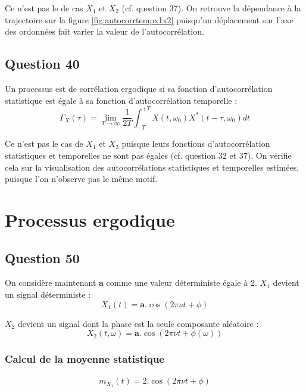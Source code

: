 \documentclass{article}
\begin{document}
\noindent
Ce n'est pas le de cas $X_1$ et $X_2$ (cf. question 37). On retrouve la dépendance à la trajectoire sur la figure \ref{fig:autocorrtempx1x2} puisqu'un déplacement sur l'axe des ordonnées fait varier la valeur de l'autocorrélation.

\subsection*{Question 40}
Un processus est de corrélation ergodique si sa fonction d'autocorrélation statistique est égale à sa fonction d'autocorrélation temporelle :
\begin{equation*}
\Gamma_X(\tau) = \lim_{T\rightarrow\infty}\frac{1}{2T}\int_{-T}^{+T}X(t,\omega_0)X^*(t-\tau,\omega_0)dt
\end{equation*}

\noindent
Ce n'est pas le cas de $X_1$ et $X_2$ puisque leurs fonctions d'autocorrélation statistiques et temporelles ne sont pas égales (cf. question 32 et 37). On vérifie cela sur la visualisation des autocorrélations statistiques et temporelles estimées, puisque l'on n'observe pas le même motif.

\section{Processus ergodique}

\subsection*{Question 50}
On considère maintenant $\boldsymbol{a}$ comme une valeur déterministe égale à $2$.
\noindent
$X_1$ devient un signal déterministe :
\begin{equation*}
X_1(t) = \boldsymbol{a}.\cos(2\pi\nu t + \phi)
\end{equation*}

\noindent
$X_2$ devient un signal dont la phase est la seule composante aléatoire :
\begin{equation*}
X_2(t,\omega) = \boldsymbol{a}.\cos(2\pi\nu t + \phi(\omega))
\end{equation*}

\subsubsection*{Calcul de la moyenne statistique}

\begin{equation}
\begin{aligned}
m_{X_1}(t) = 2.\cos(2\pi\nu t + \phi)
\end{aligned}
\end{equation}
\end{document}
